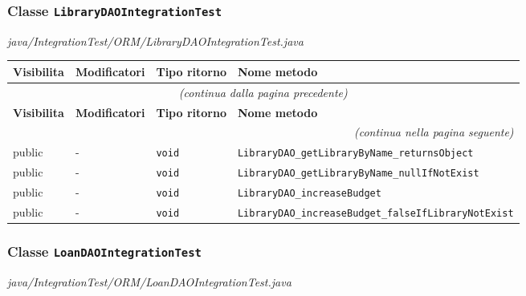 \subsubsection*{Classe \texttt{LibraryDAOIntegrationTest}}\label{LibraryDAOIntegrationTest}
{\small\textit{java/IntegrationTest/ORM/LibraryDAOIntegrationTest.java}}
\vspace{4pt}

\begin{longtable}{@{}llll@{}}
\toprule
\textbf{Visibilita} & \textbf{Modificatori} & \textbf{Tipo ritorno} & \textbf{Nome metodo} \\
\midrule
\endfirsthead
\multicolumn{4}{c}{\small\itshape (continua dalla pagina precedente)} \\
\toprule
\textbf{Visibilita} & \textbf{Modificatori} & \textbf{Tipo ritorno} & \textbf{Nome metodo} \\
\midrule
\endhead
\midrule
\multicolumn{4}{r}{\small\itshape (continua nella pagina seguente)} \\
\endfoot
\bottomrule
\endlastfoot
  public & - & \texttt{void} & \texttt{LibraryDAO\_getLibraryByName\_returnsObject} \\
  public & - & \texttt{void} & \texttt{LibraryDAO\_getLibraryByName\_nullIfNotExist} \\
  public & - & \texttt{void} & \texttt{LibraryDAO\_increaseBudget} \\
  public & - & \texttt{void} & \texttt{LibraryDAO\_increaseBudget\_falseIfLibraryNotExist} \\
\end{longtable}

\subsubsection*{Classe \texttt{LoanDAOIntegrationTest}}\label{LoanDAOIntegrationTest}
{\small\textit{java/IntegrationTest/ORM/LoanDAOIntegrationTest.java}}
\vspace{4pt}

